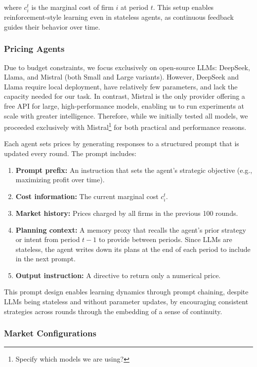 where \( c_i^t \) is the marginal cost of firm \( i \) at period \( t \). This setup enables reinforcement-style learning even in stateless agents, as continuous feedback guides their behavior over time.

\subsubsection*{Pricing Agents}

Due to budget constraints, we focus exclusively on open-source LLMs: DeepSeek, Llama, and Mistral (both Small and Large variants). However, DeepSeek and Llama require local deployment, have relatively few parameters, and lack the capacity needed for our task. In contrast, Mistral is the only provider offering a free API for large, high-performance models, enabling us to run experiments at scale with greater intelligence. Therefore, while we initially tested all models, we proceeded exclusively with Mistral\footnote{Specify which models we are using?} for both practical and performance reasons.

Each agent sets prices by generating responses to a structured prompt that is updated every round. The prompt includes:

\begin{enumerate}
    \item \textbf{Prompt prefix:} An instruction that sets the agent’s strategic objective (e.g., maximizing profit over time).
    \item \textbf{Cost information:} The current marginal cost $c_i^t$.
    \item \textbf{Market history:} Prices charged by all firms in the previous 100 rounds.
    \item \textbf{Planning context:} A memory proxy that recalls the agent’s prior strategy or intent from period $t-1$ to provide  between periods. Since LLMs are stateless, the agent writes down its plans at the end of each period to include in the next prompt. 
    \item \textbf{Output instruction:} A directive to return only a numerical price.
\end{enumerate}

This prompt design enables learning dynamics through prompt chaining, despite LLMs being stateless and without parameter updates, by encouraging consistent strategies across rounds through the embedding of a sense of continuity.


\subsubsection*{Market Configurations}

